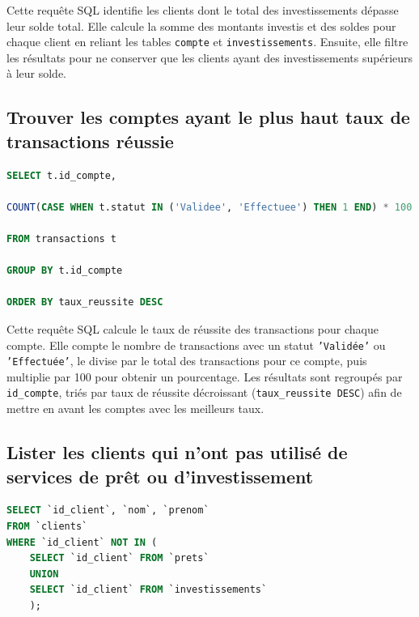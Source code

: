 \documentclass[12pt,a4paper]{article}
\begin{document}
\vspace{.5cm}

Cette requête SQL identifie les clients dont le total des investissements dépasse leur solde total. Elle calcule la somme des montants investis et des soldes pour chaque client en reliant les tables \texttt{compte} et \texttt{investissements}. Ensuite, elle filtre les résultats pour ne conserver que les clients ayant des investissements supérieurs à leur solde. 

	\subsection{Trouver les comptes ayant le plus haut taux de transactions réussie}
\begin{lstlisting}[language=SQL]
SELECT t.id_compte,  

COUNT(CASE WHEN t.statut IN ('Validee', 'Effectuee') THEN 1 END) * 100.0 / COUNT(*) AS taux_reussite  

FROM transactions t  

GROUP BY t.id_compte  

ORDER BY taux_reussite DESC 
\end{lstlisting}

\vspace{.5cm}

Cette requête SQL calcule le taux de réussite des transactions pour chaque compte. Elle compte le nombre de transactions avec un statut \texttt{'Validée'} ou \texttt{'Effectuée'}, le divise par le total des transactions pour ce compte, puis multiplie par 100 pour obtenir un pourcentage. Les résultats sont regroupés par \texttt{id\_compte}, triés par taux de réussite décroissant (\texttt{taux\_reussite DESC}) afin de mettre en avant les comptes avec les meilleurs taux. 

\newpage
	\subsection{Lister les clients qui n'ont pas utilisé de services de prêt ou d'investissement}	
	
	
\begin{lstlisting}[language=SQL]
SELECT `id_client`, `nom`, `prenom` 
FROM `clients` 
WHERE `id_client` NOT IN ( 
    SELECT `id_client` FROM `prets` 
    UNION 
    SELECT `id_client` FROM `investissements` 
    ); 
\end{lstlisting}

\vspace{.5cm}
\end{document}
